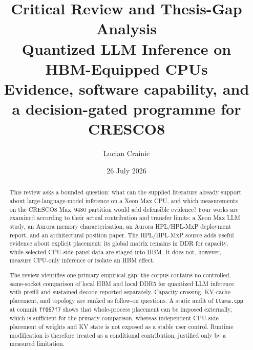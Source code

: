 \documentclass[11pt,a4paper]{article}
\title{\textbf{Critical Review and Thesis-Gap Analysis}\\[5pt]
       \Large Quantized LLM Inference on HBM-Equipped CPUs\\[3pt]
       \large Evidence, software capability, and a decision-gated
       programme for CRESCO8}
\author{Lucian Crainic}
\date{26 July 2026}
\newcommand{\lcpp}{\texttt{llama.cpp}}
\newcommand{\commitshort}{\texttt{ff067f7}}
\begin{document}
\maketitle

\begin{abstract}
\noindent
This review asks a bounded question: what can the supplied literature
already support about large-language-model inference on a Xeon Max CPU,
and which measurements on the CRESCO8 Max~9480 partition would add
defensible evidence?  Four works are examined according to their actual
contribution and transfer limits: a Xeon Max LLM study, an Aurora memory
characterisation, an Aurora HPL/HPL-MxP deployment report, and an
architectural position paper.  The HPL/HPL-MxP source adds
useful evidence about explicit placement: its global matrix remains in
DDR for capacity, while selected CPU-side panel data are staged into HBM.
It does not, however, measure CPU-only inference or isolate an HBM effect.

The review identifies one primary empirical gap: the corpus contains no
controlled, same-socket comparison of local HBM and local DDR5 for
quantized LLM inference with prefill and sustained decode reported
separately.  Capacity crossing, KV-cache placement, and topology are
ranked as follow-on questions.  A static audit of \lcpp{} at commit
\commitshort{} shows that whole-process placement can be imposed
externally, which is sufficient for the primary comparison, whereas
independent CPU-side placement of weights and KV state is not exposed as
a stable user control.  Runtime modification is therefore treated as a
conditional contribution, justified only by a measured limitation.
\end{abstract}

\tableofcontents

\clearpage


\clearpage


\clearpage


\clearpage


\clearpage


\clearpage


\clearpage


\end{document}
